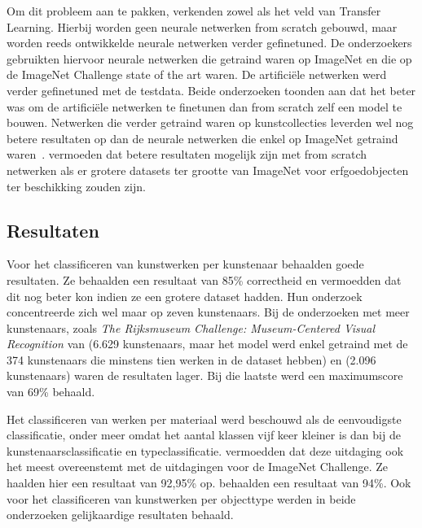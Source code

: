 Om dit probleem aan te pakken, verkenden zowel \textcite{Sabatteli2018} als \textcite{Elgammal2018} het veld van Transfer Learning. Hierbij worden geen neurale netwerken from scratch gebouwd, maar worden reeds ontwikkelde neurale netwerken verder gefinetuned. De onderzoekers gebruikten hiervoor neurale netwerken die getraind waren op ImageNet en die op de ImageNet Challenge state of the art waren. De artifici\"{e}le netwerken werd verder gefinetuned met de testdata. Beide onderzoeken toonden aan dat het beter was om de artificiële netwerken te finetunen dan from scratch zelf een model te bouwen. Netwerken die verder getraind waren op kunstcollecties leverden wel nog betere resultaten op dan de neurale netwerken die enkel op ImageNet getraind waren~\autocite{Sabatteli2018}. \textcite{Elgammal2018} vermoeden dat betere resultaten mogelijk zijn met from scratch netwerken als er grotere datasets ter grootte van ImageNet voor erfgoedobjecten ter beschikking zouden zijn.

\subsection{Resultaten}
\label{subsec:cv-voor-ce-resultaten}

Voor het classificeren van kunstwerken per kunstenaar behaalden \textcite{Blessings2013} goede resultaten. Ze behaalden een resultaat van 85\% correctheid en vermoedden dat dit nog beter kon indien ze een grotere dataset hadden. Hun onderzoek concentreerde zich wel maar op zeven kunstenaars. Bij de onderzoeken met meer kunstenaars, zoals \textit{The Rijksmuseum Challenge: Museum-Centered Visual Recognition} van \textcite{Mensink2014} (6.629 kunstenaars, maar het model werd enkel getraind met de 374 kunstenaars die minstens tien werken in de dataset hebben) en \textcite{Sabatteli2018} (2.096 kunstenaars) waren de resultaten lager. Bij die laatste werd een maximumscore van 69\% behaald.

Het classificeren van werken per materiaal werd beschouwd als de eenvoudigste classificatie, onder meer omdat het aantal klassen vijf keer kleiner is dan bij de kunstenaarsclassificatie en typeclassificatie. \textcite{Sabatteli2018} vermoedden dat deze uitdaging ook het meest overeenstemt met de uitdagingen voor de ImageNet Challenge. Ze haalden hier een resultaat van 92,95\% op. \textcite{Mensink2014} behaalden een resultaat van 94\%. Ook voor het classificeren van kunstwerken per objecttype werden in beide onderzoeken gelijkaardige resultaten behaald.

